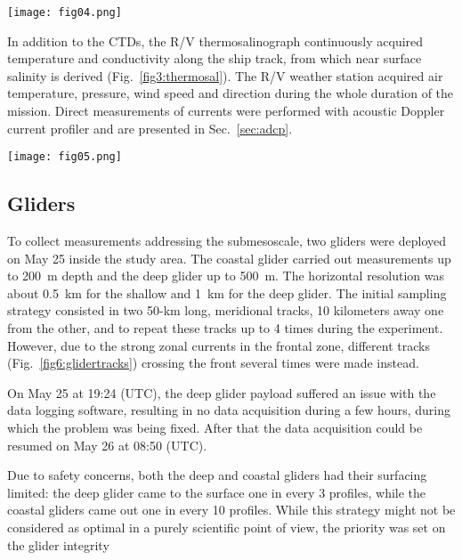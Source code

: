\documentclass[essd,manuscript]{copernicus}
\begin{document}
\begin{figure*}[t]
\texttt{[image: fig04.png]}
\caption{The T-S diagrams are shown separately for the casts located north and south of the front (broad, dashed line) \label{fig4:TSdiag}.}
\end{figure*}

In addition to the CTDs, the R/V thermosalinograph continuously acquired temperature and conductivity along the ship track, from which near surface salinity is derived (Fig.~\ref{fig3:thermosal}). The R/V weather station acquired air temperature, pressure, wind speed and direction during the whole duration of the mission. Direct measurements of currents were performed with acoustic Doppler current profiler and are presented in Sec.~\ref{sec:adcp}. 

\begin{figure*}[t]
\texttt{[image: fig05.png]}
\caption{The near-surface salinity (colored dots) measured by the thermosalinograph evidences the strong horizontal gradients, in agreement with the front position as obtained using the SST (broad, dashed line). The 5 subplots depict the temperature and salinity along select meridional tracks. \label{fig3:thermosal}}
\end{figure*}

\subsection{Gliders}

To collect measurements addressing the submesoscale, two gliders were deployed on May 25 inside the study area. The coastal glider carried out measurements up to 200~m depth and the deep glider up to 500~m. The horizontal resolution was about 0.5~km for the shallow and 1~km for the deep glider. The initial sampling strategy consisted in two 50-km long, meridional tracks, 10 kilometers away one from the other, and to repeat these tracks up to 4 times during the experiment. However, due to the strong zonal currents in the frontal zone, different tracks (Fig.~\ref{fig6:glidertracks}) crossing the front several times were made instead.

On May 25 at 19:24 (UTC), the deep glider payload suffered an issue with the data logging software, resulting in no data acquisition during a few hours, during which the problem was being fixed. After that the data acquisition could be resumed on May 26 at 08:50 (UTC).

Due to safety concerns, both the deep and coastal gliders had their surfacing limited: the deep glider came to the surface one in every 3 profiles, while the coastal gliders came out one in every 10 profiles. While this strategy might not be considered as optimal in a purely scientific point of view, the priority was set on the glider integrity
\end{document}
